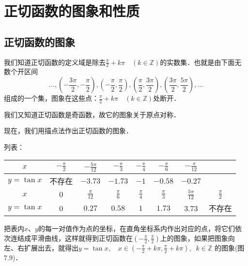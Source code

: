 \section{正切函数的图象和性质}
\subsection{正切函数的图象}
我们知道正切函数的定义域是除去$\frac{\pi}{2}+k\pi\quad (k\in\mathbb{Z})$的实数集．也就是由下面无数个开区间
\[\ldots, \left(-\frac{3\pi}{2},-\frac{\pi}{2}\right),\left(-\frac{\pi}{2},\frac{\pi}{2}\right), \left(\frac{\pi}{2},\frac{3\pi}{2}\right), \left(\frac{3\pi}{2},\frac{5\pi}{2}\right), \ldots\]
组成的一个集，图象在这些点：$\frac{\pi}{2}+k\pi\quad (k\in\mathbb{Z})$处断开．

我们又知道正切函数是奇函数，故它的图象关于原点对称．

现在，我们用描点法作出正切函数的图象．

列表：
\begin{center}
\begin{tabular}{c|ccccccc}
\hline
$x$  &    $-\frac{\pi}{2}$  &    $-\frac{5\pi}{12}$  &    $-\frac{\pi}{3}$  &    $-\frac{\pi}{4}$  &    $-\frac{\pi}{6}$  &    $-\frac{\pi}{12}$  \\    
\hline
$y=\tan x$   & 不存在  & $-3.73$  & $-1.73$  & $-1$  & $-0.58$  & $-0.27$  \\
\hline
$x$  &    $0$  &    $\frac{\pi}{12}$  &    $\frac{\pi}{6}$  &    $\frac{\pi}{4}$  &    $\frac{\pi}{3}$  &    $\frac{5\pi}{12}$ & $\frac{\pi}{2}$ \\    
\hline
$y=\tan x$   & 0  & $0.27$  & $0.58$  & $1$  & $1.73$ & 3.73 & 不存在  \\
\hline
\end{tabular}    
\end{center}

把表内$x$、$y$的每一对值作为点的坐标，在直角坐标系内作出对应的点，将它们依次连结成平滑曲线，这样就得到正切函数在$\left(-\frac{\pi}{2},\frac{\pi}{2}\right)$上的图象，如果把图象向左、右扩展出去，就得出$y=\tan x,\quad x\in\left(-\frac{\pi}{2}+k\pi,\frac{\pi}{2}+k\pi\right),\;\; k\in \mathbb{Z}$ 的图象(图7.9)．

